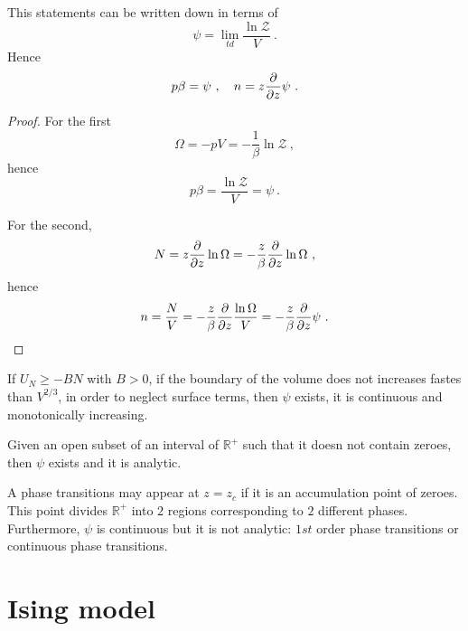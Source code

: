     This statements can be written down in terms of 
    \begin{equation*}
        \psi = \lim_{td} \frac{\ln \mathcal Z}{V} ~.
    \end{equation*}
    Hence 
    \begin{equation*}
        p \beta = \psi ~, \quad n = z \frac{\partial}{\partial z} \psi ~.
    \end{equation*}
    \begin{proof}
        For the first 
        \begin{equation*}
            \Omega = - p V = - \frac{1}{\beta} \ln \mathcal Z ~,
        \end{equation*}
        hence
        \begin{equation*}
            p \beta = \frac{\ln \mathcal Z}{V} = \psi ~.
        \end{equation*}

        For the second,
        \begin{equation*}
            N = z \frac{\partial}{\partial z} \ln \Omega = - \frac{z}{\beta} \frac{\partial}{\partial z} \ln \Omega ~,
        \end{equation*}
        hence
        \begin{equation*}
            n = \frac{N}{V} = - \frac{z}{\beta} \frac{\partial}{\partial z} \frac{\ln \Omega}{V} =  - \frac{z}{\beta} \frac{\partial}{\partial z} \psi ~.
        \end{equation*}
    \end{proof}

    \begin{theorem}
        If $U_N \geq - BN$ with $B > 0$, if the boundary of the volume does not increases fastes than $V^{2/3}$, in order to neglect surface terms, then $\psi$ exists, it is continuous and monotonically increasing.
    \end{theorem}
    \begin{theorem}
        Given an open subset of an interval of $\mathbb R^+$ such that it doesn not contain zeroes, then $\psi$ exists and it is analytic.
    \end{theorem}
    \begin{corollary}
        A phase transitions may appear at $z = z_c$ if it is an accumulation point of zeroes. This point divides $\mathbb R^+$ into $2$ regions corresponding to $2$ different phases. Furthermore, $\psi$ is continuous but it is not analytic: $1st$ order phase transitions or continuous phase transitions.
    \end{corollary}

\chapter{Ising model}

